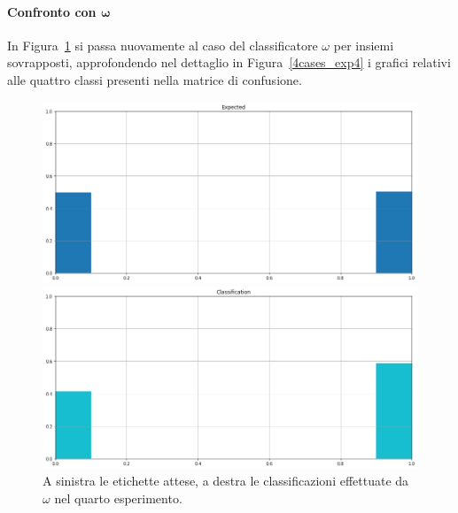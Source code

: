 \documentclass[12pt]{report}
\theoremstyle{definition}
\begin{document}
\paragraph{Confronto con $\bm{\omega}$}
In Figura~\ref{classification_exp4} si passa nuovamente al caso del classificatore $\omega$ per insiemi sovrapposti, approfondendo nel dettaglio in Figura~\ref{4cases_exp4} i grafici relativi alle quattro classi presenti nella matrice di confusione.
\begin{figure}
\centering
    \begin{minipage}{0.48\textwidth}
        \includegraphics[width=\linewidth]{images/experiment_uniform_sovrapposti/expected_classification.png}
    \end{minipage}
    \begin{minipage}{0.48\textwidth}
        \includegraphics[width=\linewidth]{images/experiment_uniform_sovrapposti/prediction_classification.png}
    \end{minipage}
    \caption{A sinistra le etichette attese, a destra le classificazioni effettuate da $\omega$ nel quarto esperimento.}
    \label{classification_exp4}
\end{figure}
\end{document}
